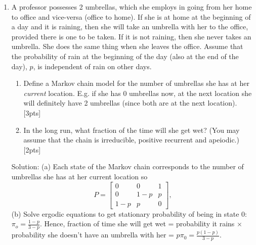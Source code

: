 \documentclass[12pt]{article}
\begin{document}
\begin{enumerate}
\newpage

\item A professor possesses 2 umbrellas, which she employs in going
  from her home to office and vice-versa (office to home). If she is
  at home at the beginning of a day and it is raining, then she will
  take an umbrella with her to the office, provided there is one to be
  taken.  If it is not raining, then she never takes an umbrella. She
  does the same thing when she leaves the office. Assume that the
  probability of rain at the beginning of the day (also at the end of
  the day), $p$, is independent of rain on other days.
\begin{enumerate}
\item Define a Markov chain model for the number of umbrellas she has
  at her {\it current} location. E.g. if she has 0 umbrellas
  now, at the next location she will definitely have 2 umbrellas (since both are at the next location). [3pts]
\item In the long run, what fraction of the time will she get wet?
  (You may assume that the chain is irreducible, positive recurrent
  and apeiodic.) [2pts]
\end{enumerate}
Solution: (a) Each state of the Markov chain corresponds to the number of umbrellas she has at her current location so 
\begin{equation*}
  P=
  \begin{bmatrix}
    0 & 0 & 1 \\
    0 & 1-p & p \\
    1-p & p & 0
  \end{bmatrix},
\end{equation*}
(b) Solve ergodic equations to get stationary probability of being in state 0: $\pi_o=\frac{1-p}{3-p}.$ Hence, fraction of time she will get wet = probability it rains $\times$ probability she doesn't have an umbrella with her = $p\pi_0=\frac{p(1-p)}{3 - p}$.


\end{enumerate}
\end{document}
